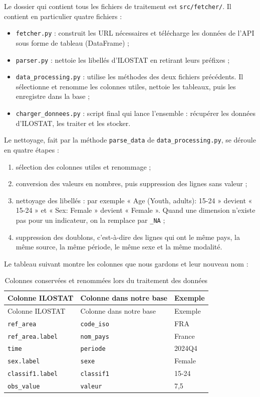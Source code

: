 \documentclass[
  french,
  12pt,
  letterpaper,
  DIV=11,
  numbers=noendperiod]{scrartcl}
\providecommand{\tightlist}{%
  \setlength{\itemsep}{0pt}\setlength{\parskip}{0pt}}
\begin{document}
Le dossier qui contient tous les fichiers de traitement est
\texttt{src/fetcher/}. Il contient en particulier quatre fichiers :

\begin{itemize}
\tightlist
\item
  \texttt{fetcher.py} : construit les URL nécessaires et télécharge les
  données de l'API sous forme de tableau (DataFrame) ;
\item
  \texttt{parser.py} : nettoie les libellés d'ILOSTAT en retirant leurs
  préfixes ;
\item
  \texttt{data\_processing.py} : utilise les méthodes des deux fichiers
  précédents. Il sélectionne et renomme les colonnes utiles, nettoie les
  tableaux, puis les enregistre dans la base ;
\item
  \texttt{charger\_donnees.py} : script final qui lance l'ensemble :
  récupérer les données d'ILOSTAT, les traiter et les stocker.
\end{itemize}

Le nettoyage, fait par la méthode \texttt{parse\_data} de
\texttt{data\_processing.py}, se déroule en quatre étapes :

\begin{enumerate}
\def\labelenumi{\arabic{enumi}.}
\tightlist
\item
  sélection des colonnes utiles et renommage ;
\item
  conversion des valeurs en nombres, puis suppression des lignes sans
  valeur ;
\item
  nettoyage des libellés : par exemple « Age (Youth, adults): 15-24 »
  devient « 15-24 » et « Sex: Female » devient « Female ». Quand une
  dimension n'existe pas pour un indicateur, on la remplace par
  \texttt{\_NA} ;
\item
  suppression des doublons, c'est-à-dire des lignes qui ont le même
  pays, la même source, la même période, le même sexe et la même
  modalité.
\end{enumerate}

Le tableau suivant montre les colonnes que nous gardons et leur nouveau
nom :

\begin{longtable}[]{@{}lll@{}}
\caption{Colonnes conservées et renommées lors du traitement des
données}\tabularnewline
\toprule\noalign{}
Colonne ILOSTAT & Colonne dans notre base & Exemple \\
\midrule\noalign{}
\endfirsthead
\toprule\noalign{}
Colonne ILOSTAT & Colonne dans notre base & Exemple \\
\midrule\noalign{}
\endhead
\bottomrule\noalign{}
\endlastfoot
\texttt{ref\_area} & \texttt{code\_iso} & FRA \\
\texttt{ref\_area.label} & \texttt{nom\_pays} & France \\
\texttt{time} & \texttt{periode} & 2024Q4 \\
\texttt{sex.label} & \texttt{sexe} & Female \\
\texttt{classif1.label} & \texttt{classif1} & 15-24 \\
\texttt{obs\_value} & \texttt{valeur} & 7,5 \\
\end{longtable}
\end{document}

